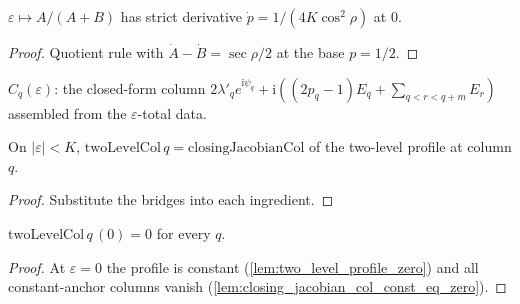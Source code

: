 \begin{lemma}
  \label{lem:has_strict_deriv_at_two_level_share}
  $\varepsilon \mapsto A/(A+B)$ has strict derivative
  $\dot p = 1/(4K\cos^2\rho)$ at $0$.
\end{lemma}
\begin{proof}

\leanok
  Quotient rule with $\dot A - \dot B = \sec\rho/2$ at the base $p = 1/2$.
\end{proof}

\begin{definition}
  \label{def:two_level_col}
  $C_q(\varepsilon)$: the closed-form column
  $2\lambda'_q e^{\mathrm{i}\psi_q} + \mathrm{i}((2p_q - 1)E_q +
  \sum_{q < r < q+m} E_r)$ assembled from the $\varepsilon$-total data.
\end{definition}

\begin{lemma}
  \label{lem:two_level_col_eq}
  On $|\varepsilon| < K$, $\mathrm{twoLevelCol}\,q =
  \mathrm{closingJacobianCol}$ of the two-level profile at column $q$.
\end{lemma}
\begin{proof}

\leanok
  Substitute the bridges into each ingredient.
\end{proof}

\begin{lemma}\leanok
[exact vanishing at $\varepsilon = 0$]
  \label{lem:two_level_col_zero}
  $\mathrm{twoLevelCol}\,q\,(0) = 0$ for every $q$.
\end{lemma}
\begin{proof}

\leanok
  At $\varepsilon = 0$ the profile is constant
  (\cref{lem:two_level_profile_zero}) and all constant-anchor columns vanish
  (\cref{lem:closing_jacobian_col_const_eq_zero}).
\end{proof}

